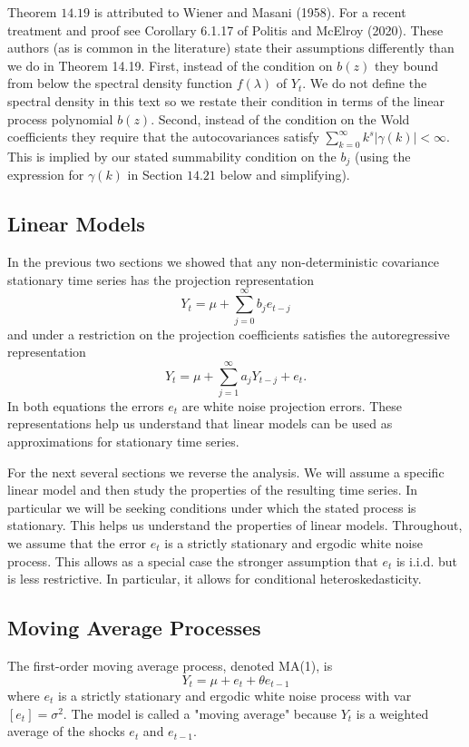 \documentclass[10pt]{article}
\begin{document}
Theorem $14.19$ is attributed to Wiener and Masani (1958). For a recent treatment and proof see Corollary 6.1.17 of Politis and McElroy (2020). These authors (as is common in the literature) state their assumptions differently than we do in Theorem 14.19. First, instead of the condition on $b(z)$ they bound from below the spectral density function $f(\lambda)$ of $Y_{t}$. We do not define the spectral density in this text so we restate their condition in terms of the linear process polynomial $b(z)$. Second, instead of the condition on the Wold coefficients they require that the autocovariances satisfy $\sum_{k=0}^{\infty} k^{s}|\gamma(k)|<\infty$. This is implied by our stated summability condition on the $b_{j}$ (using the expression for $\gamma(k)$ in Section $14.21$ below and simplifying).

\subsection{Linear Models}
In the previous two sections we showed that any non-deterministic covariance stationary time series has the projection representation
$$
Y_{t}=\mu+\sum_{j=0}^{\infty} b_{j} e_{t-j}
$$
and under a restriction on the projection coefficients satisfies the autoregressive representation
$$
Y_{t}=\mu+\sum_{j=1}^{\infty} a_{j} Y_{t-j}+e_{t} .
$$
In both equations the errors $e_{t}$ are white noise projection errors. These representations help us understand that linear models can be used as approximations for stationary time series.

For the next several sections we reverse the analysis. We will assume a specific linear model and then study the properties of the resulting time series. In particular we will be seeking conditions under which the stated process is stationary. This helps us understand the properties of linear models. Throughout, we assume that the error $e_{t}$ is a strictly stationary and ergodic white noise process. This allows as a special case the stronger assumption that $e_{t}$ is i.i.d. but is less restrictive. In particular, it allows for conditional heteroskedasticity.

\subsection{Moving Average Processes}
The first-order moving average process, denoted MA(1), is
$$
Y_{t}=\mu+e_{t}+\theta e_{t-1}
$$
where $e_{t}$ is a strictly stationary and ergodic white noise process with var $\left[e_{t}\right]=\sigma^{2}$. The model is called a "moving average" because $Y_{t}$ is a weighted average of the shocks $e_{t}$ and $e_{t-1}$.
\end{document}
